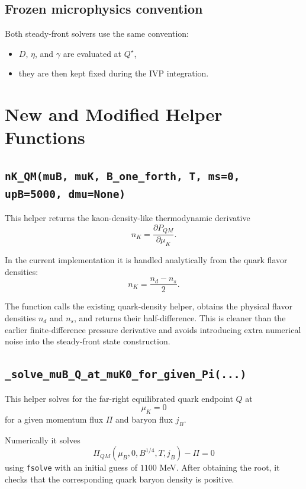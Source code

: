 \documentclass[11pt]{article}
\begin{document}
\subsection{Frozen microphysics convention}
Both steady-front solvers use the same convention:
\begin{itemize}[leftmargin=1.5em]
\item $D$, $\eta$, and $\gamma$ are evaluated at $Q^\star$,
\item they are then kept fixed during the IVP integration.
\end{itemize}

\section{New and Modified Helper Functions}
\subsection{\texttt{nK\_QM(muB, muK, B\_one\_forth, T, ms=0, upB=5000, dmu=None)}}
This helper returns the kaon-density-like thermodynamic derivative
\[
n_K = \frac{\partial P_{QM}}{\partial \mu_K}.
\]

In the current implementation it is handled analytically from the quark flavor
densities:
\begin{equation}
n_K = \frac{n_d - n_s}{2}.
\end{equation}

The function calls the existing quark-density helper, obtains the physical
flavor densities $n_d$ and $n_s$, and returns their half-difference. This is
cleaner than the earlier finite-difference pressure derivative and avoids
introducing extra numerical noise into the steady-front state construction.

\subsection{\texttt{\_solve\_muB\_Q\_at\_muK0\_for\_given\_Pi(...)}} 
This helper solves for the far-right equilibrated quark endpoint $Q$ at
\[
\mu_K = 0
\]
for a given momentum flux $\Pi$ and baryon flux $j_B$.

Numerically it solves
\begin{equation}
\Pi_{QM}(\mu_B, 0, B^{1/4}, T, j_B) - \Pi = 0
\end{equation}
using \texttt{fsolve} with an initial guess of $1100$ MeV. After obtaining the
root, it checks that the corresponding quark baryon density is positive.
\end{document}
